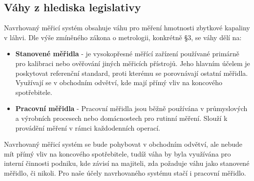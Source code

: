 \subsection{Váhy z hlediska legislativy}
Navrhovaný měřicí systém obsahuje váhu pro měření hmotnosti zbytkové kapaliny v láhvi. Dle výše zmíněného zákona o metrologii, konkrétně §3, se váhy dělí na:
\begin{itemize}
    \item \textbf{Stanovené měřidla} - je vysokopřesné měřící zařízení používané primárně pro kalibraci nebo ověřování jiných měřicích přístrojů. Jeho hlavním účelem je poskytovat referenční standard, proti kterému se porovnávají ostatní měřidla. Využívají se v obchodním odvětví, kde mají přímý vliv na koncového spotřebitele. \cite{Zákon o metrologii}
    \item \textbf{Pracovní měřidla} - Pracovní měřidla jsou běžně používána v průmyslových a výrobních procesech nebo domácnostech pro rutinní měření. Slouží k provádění měření v rámci každodenních operací. \cite{Zákon o metrologii}
\end{itemize}
\smallskip
Navrhovaný měřicí systém se bude pohybovat v obchodním odvětví, ale nebude mít přímý vliv na koncového spotřebitele, tudíž váha by byla využívána pro interní činnosti podniku, kde závisí na majiteli, zda požaduje váhu jako stanovené měřidlo, či nikoli. Pro naše účely navrhovaného systému stačí i pracovní měřidlo.\cite{použití elektronických vah v obchodním styku}

